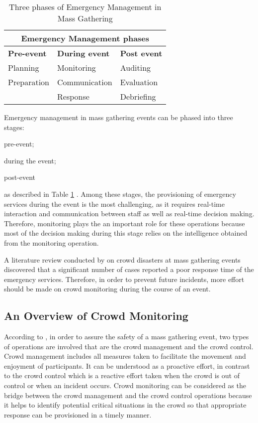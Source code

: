 \begin{table}[!htbp]
	\caption{Three phases of Emergency Management in Mass Gathering}
	\label{table:phaseOfEm}
	\centering
	\begin{tabular}{|p{3cm}|p{3cm}|p{3cm}|}
		\hline
		\multicolumn{3}{|c|}{\textbf{Emergency Management phases}} \\ \hline \hline
		\textbf{Pre-event} & \textbf{During event} & \textbf{Post event} \\	\hline
		Planning & Monitoring  & Auditing  \\
		Preparation & Communication & Evaluation \\
		& Response & Debriefing \\
		\hline
	\end{tabular}
\end{table}

Emergency management in mass gathering events can be phased into three stages: 
\begin{inparaenum}[i)]
	\item pre-event;
	\item during the event;
	\item post-event
\end{inparaenum} as described in Table \ref{table:phaseOfEm} \citep{DelirHaghighi2013}. Among these stages, the provisioning of emergency services during the event is the most challenging, as it requires real-time interaction and communication between staff as well as real-time decision making. Therefore, monitoring plays the an important role for these operations because most of the decision making during this stage relies on the intelligence obtained from the monitoring operation. 

A literature review conducted by \citet{Soomaroo2012} on crowd disasters at mass gathering events discovered that a significant number of cases reported a poor response time of the emergency services. Therefore, in order to prevent future incidents, more effort should be made on crowd monitoring during the course of an event. 

\subsection{An Overview of Crowd Monitoring}

According to \citet{Berlonghi1995}, in order to assure the safety of a mass gathering event, two types of operations are involved that are the crowd management and the crowd control. Crowd management includes all measures taken to facilitate the movement and enjoyment of participants. It can be understood as a proactive effort, in contrast to the crowd control which is a reactive effort taken when the crowd is out of control or when an incident occurs. Crowd monitoring can be considered as the bridge between the crowd management and the crowd control operations because it helps to identify potential critical situations in the crowd so that appropriate response can be provisioned in a timely manner.


